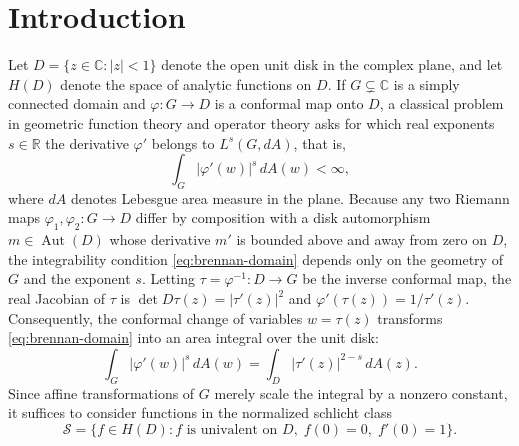 \documentclass[12pt]{article}
\def\R{\mathbb{R}}
\def\C{\mathbb{C}}
\def\S{\mathcal{S}}
\theoremstyle{definition}
\numberwithin{equation}{section}
\begin{document}
\section{Introduction}

Let $D = \{z \in \C : |z| < 1\}$ denote the open unit disk in the complex plane, and let $H(D)$ denote the space of analytic functions on $D$. If $G \subsetneq \C$ is a simply connected domain and $\varphi : G \to D$ is a conformal map onto $D$, a classical problem in geometric function theory and operator theory asks for which real exponents $s \in \R$ the derivative $\varphi'$ belongs to $L^s(G, dA)$, that is,
\begin{equation}\label{eq:brennan-domain}
  \int_G |\varphi'(w)|^s \, dA(w) < \infty,
\end{equation}
where $dA$ denotes Lebesgue area measure in the plane. Because any two Riemann maps $\varphi_1, \varphi_2 : G \to D$ differ by composition with a disk automorphism $m \in \operatorname{Aut}(D)$ whose derivative $m'$ is bounded above and away from zero on $D$, the integrability condition \eqref{eq:brennan-domain} depends only on the geometry of $G$ and the exponent $s$. Letting $\tau = \varphi^{-1} : D \to G$ be the inverse conformal map, the real Jacobian of $\tau$ is $\det D\tau(z) = |\tau'(z)|^2$ and $\varphi'(\tau(z)) = 1/\tau'(z)$. Consequently, the conformal change of variables $w = \tau(z)$ transforms \eqref{eq:brennan-domain} into an area integral over the unit disk:
\begin{equation}\label{eq:brennan-disk}
  \int_G |\varphi'(w)|^s \, dA(w) = \int_D |\tau'(z)|^{2-s} \, dA(z).
\end{equation}
Since affine transformations of $G$ merely scale the integral by a nonzero constant, it suffices to consider functions in the normalized schlicht class
\[
  \S = \{f \in H(D) : f \text{ is univalent on } D,\; f(0) = 0,\; f'(0) = 1\}.
\]
\end{document}
